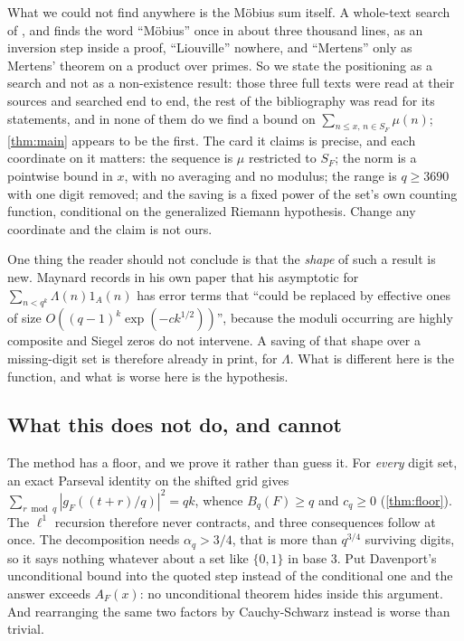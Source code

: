 \documentclass[11pt]{amsart}
\theoremstyle{definition}
\theoremstyle{remark}
\begin{document}
What we could not find anywhere is the M\"obius sum itself. A whole-text search of \cite{maynard19}, \cite{maynard22} and \cite{nath} finds the word ``M\"obius'' once in about three thousand lines, as an inversion step inside a proof, ``Liouville'' nowhere, and ``Mertens'' only as Mertens' theorem on a product over primes. So we state the positioning as a search and not as a non-existence result: those three full texts were read at their sources and searched end to end, the rest of the bibliography was read for its statements, and in none of them do we find a bound on $\sum_{n \le x,\, n \in S_F} \mu(n)$; \cref{thm:main} appears to be the first. The card it claims is precise, and each coordinate on it matters: the sequence is $\mu$ restricted to $S_F$; the norm is a pointwise bound in $x$, with no averaging and no modulus; the range is $q \ge 3690$ with one digit removed; and the saving is a fixed power of the set's own counting function, conditional on the generalized Riemann hypothesis. Change any coordinate and the claim is not ours.

One thing the reader should not conclude is that the \emph{shape} of such a result is new. Maynard \cite{maynard22} records in his own paper that his asymptotic for $\sum_{n < q^k} \Lambda(n) 1_A(n)$ has error terms that ``could be replaced by effective ones of size $O((q-1)^k \exp(-c k^{1/2}))$'', because the moduli occurring are highly composite and Siegel zeros do not intervene. A saving of that shape over a missing-digit set is therefore already in print, for $\Lambda$. What is different here is the function, and what is worse here is the hypothesis.

\subsection*{What this does not do, and cannot}

The method has a floor, and we prove it rather than guess it. For \emph{every} digit set, an exact Parseval identity on the shifted grid gives $\sum_{r \bmod q} |g_F((t+r)/q)|^2 = qk$, whence $B_q(F) \ge q$ and $c_q \ge 0$ (\cref{thm:floor}). The $\ell^1$ recursion therefore never contracts, and three consequences follow at once. The decomposition needs $\alpha_q > 3/4$, that is more than $q^{3/4}$ surviving digits, so it says nothing whatever about a set like $\{0,1\}$ in base $3$. Put Davenport's unconditional bound into the quoted step instead of the conditional one and the answer exceeds $A_F(x)$: no unconditional theorem hides inside this argument. And rearranging the same two factors by Cauchy-Schwarz instead is worse than trivial.
\end{document}
